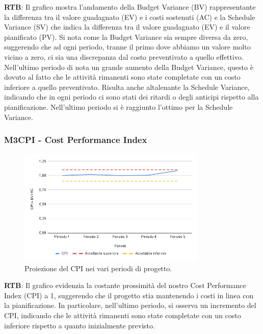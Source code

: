 \textbf{RTB}: Il grafico mostra l'andamento della Budget Variance (BV) rappresentante la differenza tra il valore guadagnato (EV) e i costi sostenuti (AC) e la Schedule Variance (SV) che indica la differenza tra il valore guadagnato (EV) e il valore pianificato (PV). Si nota come la Budget Variance sia sempre diversa da zero, suggerendo che ad ogni periodo, tranne il primo dove abbiamo un valore molto vicino a zero, ci sia una discrepanza dal costo preventivato a quello effettivo. Nell'ultimo periodo di nota un grande aumento della Budget Variance, questo è dovuto al fatto che le attività rimanenti sono state completate con un costo inferiore a quello preventivato. 
Risulta anche altalenante la Schedule Variance, indicando che in ogni periodo ci sono stati dei ritardi o degli anticipi rispetto alla pianificazione. Nell'ultimo periodo si è raggiunto l'ottimo per la Schedule Variance. 

\subsubsection{M3CPI - Cost Performance Index}
\begin{figure}[H]
    \centering
    \includegraphics[width=0.8\textwidth]{../Images/PianoDiQualifica/M3CPI.png}
    \caption{Proiezione del CPI nei vari periodi di progetto.}
    \label{fig:5}
\end{figure}

\textbf{RTB}: Il grafico evidenzia la costante prossimità del nostro Cost Performance Index (CPI) a 1, suggerendo che il progetto stia mantenendo i costi in linea con la pianificazione. In particolare, nell'ultimo periodo, si osserva un incremento del CPI, indicando che le attività rimanenti sono state completate con un costo inferiore rispetto a quanto inizialmente previsto.

